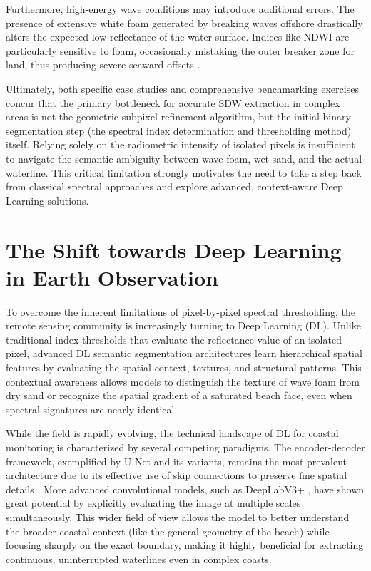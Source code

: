 ﻿\documentclass[ENG]{TFUOC}%
\begin{document}
Furthermore, high-energy wave conditions may introduce additional errors. The presence of extensive white foam generated by breaking waves offshore drastically alters the expected low reflectance of the water surface. Indices like NDWI are particularly sensitive to foam, occasionally mistaking the outer breaker zone for land, thus producing severe seaward offsets \citep{hagenaars_accuracy_2018, cabezas_site-specific_2026}.

Ultimately, both specific case studies \citep{cabezas_site-specific_2026} and comprehensive benchmarking exercises \citep{vos_benchmarking_2023} concur that the primary bottleneck for accurate SDW extraction in complex areas is not the geometric subpixel refinement algorithm, but the initial binary segmentation step (the spectral index determination and thresholding method) itself. Relying solely on the radiometric intensity of isolated pixels is insufficient to navigate the semantic ambiguity between wave foam, wet sand, and the actual waterline. This critical limitation strongly motivates the need to take a step back from classical spectral approaches and explore advanced, context-aware Deep Learning solutions.

\section{The Shift towards Deep Learning in Earth Observation}

To overcome the inherent limitations of pixel-by-pixel spectral thresholding, the remote sensing community is increasingly turning to Deep Learning (DL). Unlike traditional index thresholds that evaluate the reflectance value of an isolated pixel, advanced DL semantic segmentation architectures learn hierarchical spatial features by evaluating the spatial context, textures, and structural patterns. This contextual awareness allows models to distinguish the texture of wave foam from dry sand or recognize the spatial gradient of a saturated beach face, even when spectral signatures are nearly identical.

While the field is rapidly evolving, the technical landscape of DL for coastal monitoring is characterized by several competing paradigms. The encoder-decoder framework, exemplified by U-Net \citep{navab_u-net_2015} and its variants, remains the most prevalent architecture due to its effective use of skip connections to preserve fine spatial details \citep{tsiakos_use_2023}. More advanced convolutional models, such as DeepLabV3+ \citep{chen_encoder-decoder_2018}, have shown great potential by explicitly evaluating the image at multiple scales simultaneously. This wider field of view allows the model to better understand the broader coastal context (like the general geometry of the beach) while focusing sharply on the exact boundary, making it highly beneficial for extracting continuous, uninterrupted waterlines even in complex coasts.
\end{document}
